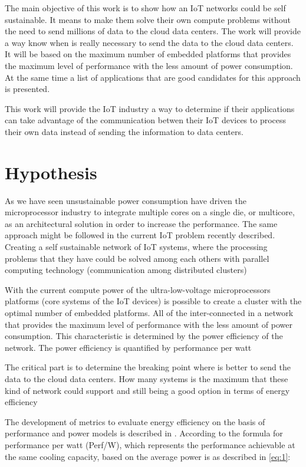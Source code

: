 The main objective of this work is to show how an IoT networks could be self
sustainable. It means to make them solve their own compute problems without the
need to send millions of data to the cloud data centers. The work will provide
a way know when is really necessary to send the data to the cloud data centers.
It will be based on the maximum number of embedded platforms that provides the
maximum level of performance with the less amount of power consumption. At the
same time a list of applications that are good candidates for this approach is
presented. 

This work will provide the IoT industry a way  to determine if their
applications can take advantage of the communication betwen their IoT devices
to process their own data instead of sending the information to data centers.

\section{Hypothesis} \noindent

As we have seen unsustainable power consumption have driven the microprocessor
industry to integrate multiple cores on a single die, or multicore, as an
architectural solution in order to increase the performance. The same approach
might be followed in the current IoT problem recently described. Creating a
self sustainable network of IoT systems, where the processing problems that
they have could be solved among each others with parallel computing technology
(communication among distributed clusters)

With the current compute power of the ultra-low-voltage microprocessors
platforms (core systems of the IoT devices) is possible to create a cluster
with the optimal number of embedded platforms. All of the inter-connected in a
network that provides the maximum level of performance with the less amount of
power consumption. This characteristic is determined by the power efficiency of
the network. The power efficiency is quantified by performance per watt
\cite{Jun}

The critical part is to determine the breaking point where is better to send
the data to the cloud data centers. How many systems is the maximum that these
kind of network could support and still being a good option in terms of energy
efficiency

The development of metrics to evaluate energy efficiency on the basis of
performance and power models is described in \cite{Dong}. According to
\cite{Dong} the formula for performance per watt (Perf/W), which represents the
performance achievable at the same cooling capacity, based on the average power
is as described in \ref{eq:1}:

